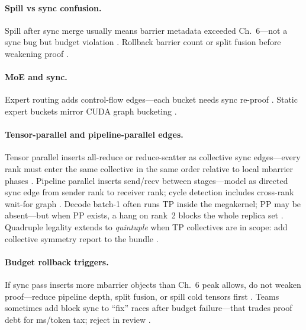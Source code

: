 \paragraph{Spill vs sync confusion.}
Spill after sync merge usually means barrier metadata exceeded Ch.~6---not a sync bug but budget violation \citep{memoryfloor2026,yirage2026,dao2022flashattention}.
Rollback barrier count or split fusion before weakening proof \citep{wu2024mirage,chen2020compilerbasedhardw,mpk2025}.

\paragraph{MoE and sync.}
Expert routing adds control-flow edges---each bucket needs sync re-proof \citep{taxbreak2026,liu2024deepseekv3,mpk2025,patel2025llminference}.
Static expert buckets mirror CUDA graph bucketing \citep{nvidia2024cudagraphs,yirage2026,shah2024flashattention3}.

\paragraph{Tensor-parallel and pipeline-parallel edges.}
Tensor parallel inserts all-reduce or reduce-scatter as collective sync edges---every rank must enter the same collective in the same order relative to local mbarrier phases \citep{patel2025llminference,dlbook,mpk2025}.
Pipeline parallel inserts send/recv between stages---model as directed sync edge from sender rank to receiver rank; cycle detection includes cross-rank wait-for graph \citep{yirage2026,shah2024flashattention3}.
Decode batch-1 often runs TP inside the megakernel; PP may be absent---but when PP exists, a hang on rank~2 blocks the whole replica set \citep{taxbreak2026,patel2025llminference}.
Quadruple legality extends to \emph{quintuple} when TP collectives are in scope: add collective symmetry report to the bundle \citep{chen2020compilerbasedhardw,wu2024mirage}.

\paragraph{Budget rollback triggers.}
If sync pass inserts more mbarrier objects than Ch.~6 peak allows, do not weaken proof---reduce pipeline depth, split fusion, or spill cold tensors first \citep{memoryfloor2026,yirage2026,dao2022flashattention}.
Teams sometimes add block sync to ``fix'' races after budget failure---that trades proof debt for ms/token tax; reject in review \citep{taxbreak2026,shah2024flashattention3,patel2025llminference}.

